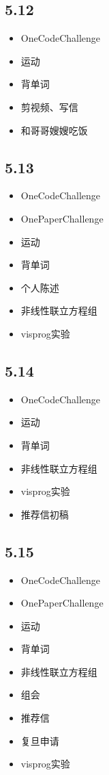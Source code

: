 \documentclass[UTF8]{ctexart}
\begin{document}
\subsection*{5.12}
\begin{itemize}
    \item OneCodeChallenge
    \item 运动
    \item 背单词
    \item 剪视频、写信
    \item 和哥哥嫂嫂吃饭
\end{itemize}

\subsection*{5.13}
\begin{itemize}
    \item OneCodeChallenge
    \item OnePaperChallenge
    \item 运动
    \item 背单词
    \item 个人陈述
    \item 非线性联立方程组
    \item visprog实验
\end{itemize}

\subsection*{5.14}
\begin{itemize}
    \item OneCodeChallenge
    \item 运动
    \item 背单词
    \item 非线性联立方程组
    \item visprog实验
    \item 推荐信初稿
\end{itemize}

\subsection*{5.15}
\begin{itemize}
    \item OneCodeChallenge
    \item OnePaperChallenge
    \item 运动
    \item 背单词
    \item 非线性联立方程组
    \item 组会
    \item 推荐信
    \item 复旦申请
    \item visprog实验
\end{itemize}
\end{document}
